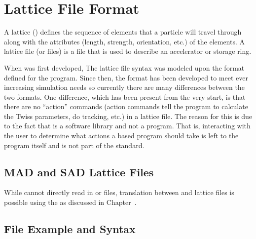 \chapter{Lattice File Format}
\label{c:lat.file}

A lattice () defines the sequence of elements that a particle will travel
through along with the attributes (length, strength, orientation, etc.) of the elements.  A lattice
file (or files) is a file that is used to describe an accelerator or storage ring.

When \bmad was first developed, The \bmad lattice file syntax was modeled upon the format defined
for the \mad program\cite{b:mad}. Since then, the \bmad format has been developed to meet ever
increasing simulation needs so currently there are many differences between the two formats. One
difference, which has been present from the very start, is that there are no ``action'' commands
(action commands tell the program to calculate the Twiss parameters, do tracking, etc.) in a \bmad
lattice file. The reason for this is due to the fact that \bmad is a software library and not a
program. That is, interacting with the user to determine what actions a \bmad based program should
take is left to the program itself and is not part of the \bmad standard.

\section{MAD and SAD Lattice Files}
\label{s:mad.sad}

While \bmad cannot directly read in \mad\cite{b:maduser} or \cite{b:sad} files, translation
between \mad and \bmad lattice files is possible using the  as
discussed in Chapter~.

\newpage

\section{File Example and Syntax}

